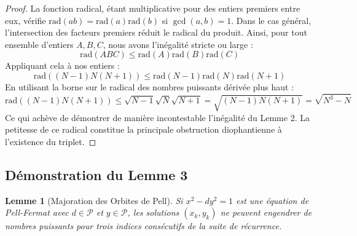 \documentclass[11pt,a4paper]{article}
\newtheorem{lemma}[theorem]{Lemme}
\begin{document}
\begin{proof}
La fonction radical, étant multiplicative pour des entiers premiers entre eux, vérifie $\text{rad}(ab) = \text{rad}(a)\text{rad}(b)$ si $\gcd(a,b)=1$.
Dans le cas général, l'intersection des facteurs premiers réduit le radical du produit. Ainsi, pour tout ensemble d'entiers $A, B, C$, nous avons l'inégalité stricte ou large :
\begin{equation}
\text{rad}(ABC) \le \text{rad}(A) \text{rad}(B) \text{rad}(C)
\end{equation}
Appliquant cela à nos entiers :
\begin{equation}
\text{rad}((N-1)N(N+1)) \le \text{rad}(N-1)\text{rad}(N)\text{rad}(N+1)
\end{equation}
En utilisant la borne sur le radical des nombres puissants dérivée plus haut :
\begin{equation}
\text{rad}((N-1)N(N+1)) \le \sqrt{N-1} \sqrt{N} \sqrt{N+1} = \sqrt{(N-1)N(N+1)} = \sqrt{N^3 - N}
\end{equation}
Ce qui achève de démontrer de manière incontestable l'inégalité du Lemme 2. La petitesse de ce radical constitue la principale obstruction diophantienne à l'existence du triplet.
\end{proof}

\newpage
\subsection{Démonstration du Lemme 3}

\begin{lemma}[Majoration des Orbites de Pell]
Si $x^2 - dy^2 = 1$ est une équation de Pell-Fermat avec $d \in \mathcal{P}$ et $y \in \mathcal{P}$, les solutions $(x_k, y_k)$ ne peuvent engendrer de nombres puissants pour trois indices consécutifs de la suite de récurrence.
\end{lemma}
\end{document}
